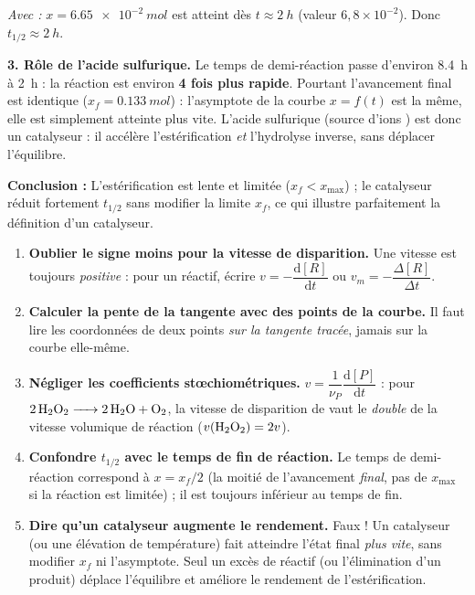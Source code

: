\documentclass[11pt]{article}
\newcommand{\cle}[1]{{\popxbold\color{popdark}#1}}
\begin{document}
\begin{exoresolu}
\emph{Avec  :} $x = \SI{6,65e-2}{mol}$ est atteint dès $t \approx \SI{2}{h}$ (valeur $6,8\times 10^{-2}$). Donc $t_{1/2} \approx \SI{2}{h}$.

\textbf{3. Rôle de l'acide sulfurique.}
Le temps de demi-réaction passe d'environ \SI{8,4}{h} à \SI{2}{h} : la réaction est environ \textbf{4 fois plus rapide}. Pourtant l'avancement final est identique ($x_f = \SI{0,133}{mol}$) : l'asymptote de la courbe $x=f(t)$ est la même, elle est simplement atteinte plus vite. L'acide sulfurique (source d'ions ) est donc un \cle{catalyseur} : il accélère l'estérification \emph{et} l'hydrolyse inverse, sans déplacer l'équilibre.

\textbf{Conclusion :} L'estérification est lente et limitée ($x_f < x_{\max}$) ; le catalyseur  réduit fortement $t_{1/2}$ sans modifier la limite $x_f$, ce qui illustre parfaitement la définition d'un catalyseur.
\end{exoresolu}

\begin{attention}
\begin{enumerate}
\item \textbf{Oublier le signe moins pour la vitesse de disparition.} Une vitesse est toujours \emph{positive} : pour un réactif, écrire $v = -\dfrac{\mathrm{d}[R]}{\mathrm{d}t}$ ou $v_m = -\dfrac{\Delta[R]}{\Delta t}$.
\item \textbf{Calculer la pente de la tangente avec des points de la courbe.} Il faut lire les coordonnées de deux points \emph{sur la tangente tracée}, jamais sur la courbe elle-même.
\item \textbf{Négliger les coefficients stœchiométriques.} $v = \dfrac{1}{\nu_P}\dfrac{\mathrm{d}[P]}{\mathrm{d}t}$ : pour $\ce{2 H2O2 -> 2 H2O + O2}$, la vitesse de disparition de  vaut le \emph{double} de la vitesse volumique de réaction ($v(\ce{H2O2}) = 2v$).
\item \textbf{Confondre $t_{1/2}$ avec le temps de fin de réaction.} Le temps de demi-réaction correspond à $x = x_f/2$ (la moitié de l'avancement \emph{final}, pas de $x_{\max}$ si la réaction est limitée) ; il est toujours inférieur au temps de fin.
\item \textbf{Dire qu'un catalyseur augmente le rendement.} Faux ! Un catalyseur (ou une élévation de température) fait atteindre l'état final \emph{plus vite}, sans modifier $x_f$ ni l'asymptote. Seul un excès de réactif (ou l'élimination d'un produit) déplace l'équilibre et améliore le rendement de l'estérification.
\end{enumerate}
\end{attention}
\end{document}

